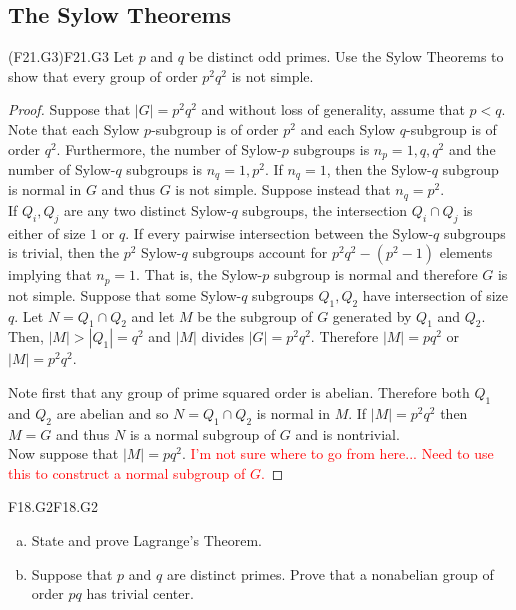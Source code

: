 \documentclass[../AlgebraQualSolutions.tex]{subfiles}
\begin{document}
\subsection{The Sylow Theorems}

	\begin{prob}{(F21.G3)}{F21.G3}
	Let $p$ and $q$ be distinct odd primes. Use the Sylow Theorems to show that every group of order $p^2q^2$ is not simple.
	\end{prob}	
	
	\begin{proof}
	Suppose that $|G| = p^2q^2$ and without loss of generality, assume that $p < q$. Note that each Sylow $p$-subgroup is of order $p^2$ and each Sylow $q$-subgroup is of order $q^2$. Furthermore, the number of Sylow-$p$ subgroups is $n_p = 1, q, q^2$ and the number of Sylow-$q$ subgroups is $n_q = 1, p^2$. If $n_q = 1$, then the Sylow-$q$ subgroup is normal in $G$ and thus $G$ is not simple. Suppose instead that $n_q = p^2$.\\
	
	If $Q_i, Q_j$ are any two distinct Sylow-$q$ subgroups, the intersection $Q_i \cap Q_j$ is either of size $1$ or $q$. If every pairwise intersection between the Sylow-$q$ subgroups is trivial, then the $p^2$ Sylow-$q$ subgroups account for $p^2q^2 - (p^2 -1)$ elements implying that $n_p = 1$. That is, the Sylow-$p$ subgroup is normal and therefore $G$ is not simple. Suppose that some Sylow-$q$ subgroups $Q_1, Q_2$ have intersection of size $q$. Let $N = Q_1 \cap Q_2$ and let $M$ be the subgroup of $G$ generated by $Q_1$ and $Q_2$. Then, $|M| > |Q_1| = q^2$ and $|M|$ divides $|G| = p^2q^2$. Therefore $|M| = pq^2$ or $|M| = p^2 q^2$. 
	
	Note first that any group of prime squared order is abelian. Therefore both $Q_1$ and $Q_2$ are abelian and so $N = Q_1 \cap Q_2$ is normal in $M$. If $|M| = p^2q^2$ then $M=G$ and thus $N$ is a normal subgroup of $G$ and is nontrivial.\\
	
	Now suppose that $|M| = pq^2$. \textcolor{red}{I'm not sure where to go from here... Need to use this to construct a normal subgroup of $G$.}
	\end{proof}
	\begin{prob}{F18.G2}{F18.G2}
		\begin{enumerate}[(a)]
			\item State and prove Lagrange's Theorem.
			\item Suppose that $p$ and $q$ are distinct primes. Prove that a nonabelian group of order $pq$ has trivial center.
		\end{enumerate}
	\end{prob}
\end{document}
